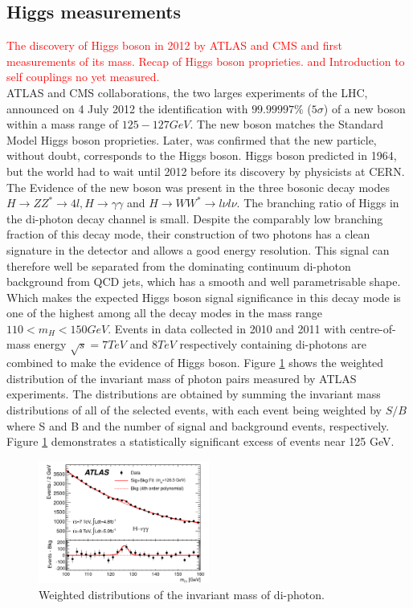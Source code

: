 \subsection{Higgs measurements}
\label{chap1:H2012:HM}
\textcolor{red}{The discovery of Higgs boson in 2012 by ATLAS and CMS and first measurements of its mass.
Recap of Higgs boson proprieties. and Introduction to self couplings no yet measured. \\
}
ATLAS and CMS collaborations, the two larges experiments of the LHC, announced on 4 July 2012 the identification with $99.99997\%$ ($5\sigma$) of a new boson within a mass range of $125-127 GeV$. The new boson matches the Standard Model Higgs boson proprieties. Later, was confirmed that the new particle, without doubt, corresponds to the Higgs boson. Higgs boson predicted in 1964, but the world had to wait until 2012 before its discovery by physicists at CERN. The Evidence of the new boson was present in the three bosonic decay modes $H\rightarrow ZZ^* \rightarrow 4l, H\rightarrow\gamma\gamma$ and $H\rightarrow WW^*\rightarrow l\nu l\nu$. The branching ratio of Higgs in the di-photon decay channel is small. Despite the comparably low branching fraction of this decay mode, their construction of two photons has a clean signature in the detector and allows a good energy resolution. This signal can therefore well be separated from the dominating continuum di-photon background from QCD jets, which has a smooth and well parametrisable shape. Which makes the expected Higgs boson signal significance in this decay mode is one of the highest among all the decay modes in the mass range $110 < m_{H} < 150 GeV$. Events in data collected in 2010 and 2011 with centre-of-mass energy $\sqrt{s}=7 TeV$ and $8 TeV$ respectively containing di-photons are combined to make the evidence of Higgs boson. Figure \ref{fig:chap1:H2012:Hyy} shows the weighted distribution of the invariant mass of photon pairs measured by ATLAS experiments. The distributions are obtained by summing the invariant mass distributions of all of the selected events, with each event being weighted by $S/B$ where S and B and the number of signal and background events, respectively. Figure \ref{fig:chap1:H2012:Hyy} demonstrates a statistically significant excess of events near 125 GeV. \\
\begin{figure}[h!]
    \centering
    \includegraphics[width=0.5\textwidth]{Ch1/Img/Hmyy.png}
    \caption{Weighted distributions of the invariant mass of di-photon.}
    \label{fig:chap1:H2012:Hyy}
\end{figure}
